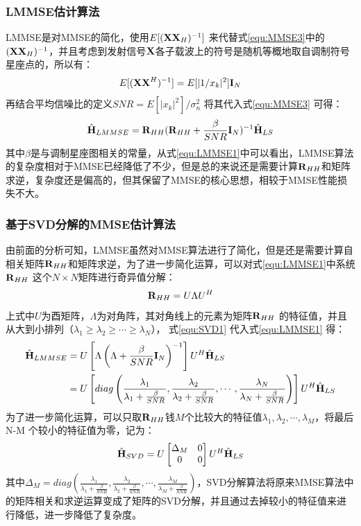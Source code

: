 \subsubsection{LMMSE估计算法}
LMMSE是对MMSE的简化，使用$E[(\textbf X \textbf X_H)^{-1}]$ 来代替式\ref{equ:MMSE3}中的$(\textbf X \textbf X_H)^{-1}$\cite{付可2015lte}，并且考虑到发射信号$\textbf X$各子载波上的符号是随机等概地取自调制符号星座点的，所以有：
\begin{equation}
E[(\textbf X \textbf X^H)^{-1}]=E[|1/x_k|^2]\textbf I_N
\end{equation}
再结合平均信噪比的定义$SNR=E[|x_k|^2]/{\sigma_n^2}$ 将其代入式\ref{equ:MMSE3} 可得：
\begin{equation}
\hat{\textbf H}_{LMMSE}=\textbf R_{HH}(\textbf R_{HH}+\frac{\beta}{SNR}\textbf I_N)^{-1}\hat{\textbf H}_{LS}
\label{equ:LMMSE1}
\end{equation}
其中$\beta$是与调制星座图相关的常量\cite{张乃元2010lte}，从式\ref{equ:LMMSE1}中可以看出，LMMSE算法的复杂度相对于MMSE已经降低了不少，但是总的来说还是需要计算$\textbf R_{HH}$和矩阵求逆，复杂度还是偏高的，但其保留了MMSE的核心思想，相较于MMSE性能损失不大。
\subsubsection{基于SVD分解的MMSE估计算法}
由前面的分析可知，LMMSE虽然对MMSE算法进行了简化，但是还是需要计算自相关矩阵$\textbf R_{HH}$和矩阵求逆，为了进一步简化运算，可以对式\ref{equ:LMMSE1}中系统$\textbf R_{HH}$ 这个$N\times N$矩阵进行奇异值分解：
\begin{equation}
\textbf R_{HH} = U \Lambda U^H
\label{equ:SVD1}
\end{equation}
上式中$U$为酉矩阵，$\Lambda$为对角阵，其对角线上的元素为矩阵$\textbf R_{HH}$ 的特征值，并且从大到小排列（$\lambda_1\geq\lambda_2\geq\cdots\geq\lambda_N$）， 式\ref{equ:SVD1} 代入式\ref{equ:LMMSE1} 得：
\begin{equation}
\begin{aligned}
\hat{\textbf H}_{LMMSE}&=U\left[\Lambda\left(\Lambda+\frac{\beta}{SNR}\textbf I_N\right)^{-1}\right]U^H\hat{\textbf H}_{LS} \\
&=U\left[diag\left(\frac{\lambda_1}{\lambda_1+\frac{\beta}{SNR}},\frac{\lambda_2}{\lambda_2+\frac{\beta}{SNR}},\cdots,\frac{\lambda_N}{\lambda_N+\frac{\beta}{SNR}}\right)\right]U^H\hat{\textbf H}_{LS}
\end{aligned}
\end{equation}
为了进一步简化运算，可以只取$\textbf R_{HH}$钱$M$个比较大的特征值$\lambda_1,\lambda_2,\cdots,\lambda_M$，将最后N-M 个较小的特征值为零，记为：
\begin{equation}
\hat{\textbf H}_{SVD}=U \begin{bmatrix}\Delta_M & 0 \\ 0 & 0 \end{bmatrix} U^H \hat{\textbf H}_{LS}
\end{equation}
其中$\Delta_M = diag\left(\frac{\lambda_1}{\lambda_1+\frac{\beta}{SNR}},\frac{\lambda_2}{\lambda_2+\frac{\beta}{SNR}},\cdots,\frac{\lambda_M}{\lambda_M+\frac{\beta}{SNR}}\right)$，SVD分解算法将原来MMSE算法中的矩阵相关和求逆运算变成了矩阵的SVD分解，并且通过去掉较小的特征值来进行降低，进一步降低了复杂度。
